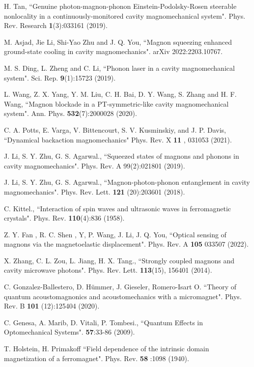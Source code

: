 \documentclass[aps,pra,superscriptaddress,balancelastpage,twocolumn]{revtex4}
\begin{document}
\begin{thebibliography}{99}
 H. Tan, ``Genuine photon-magnon-phonon
Einstein-Podolsky-Rosen steerable nonlocality in a continuously-monitored
cavity magnomechanical system". Phys. Rev. Research \textbf{1}(3):033161
(2019).

 M. Asjad, Jie Li, Shi-Yao Zhu and J. Q. You, ``Magnon
squeezing enhanced ground-state cooling in cavity magnomechanics". arXiv
2022:2203.10767.

 M. S. Ding, L. Zheng and C. Li, ``Phonon laser in a cavity
magnomechanical system". Sci. Rep. \textbf{9}(1):15723 (2019).

 L. Wang, Z. X. Yang, Y. M. Liu, C. H. Bai, D. Y. Wang, S.
Zhang and H. F. Wang, ``Magnon blockade in a PT-symmetric-like cavity
magnomechanical system". Ann. Phys. \textbf{532}(7):2000028 (2020).

 C. A. Potts, E. Varga, V. Bittencourt, S. V. Kusminskiy, and
J. P. Davis, ``Dynamical backaction magnomechanics" Phys. Rev. X \textbf{11}%
, 031053 (2021).

 J. Li, S. Y. Zhu, G. S. Agarwal., ``Squeezed states of
magnons and phonons in cavity magnomechanics". Phys. Rev. A 99(2):021801
(2019).

 J. Li, S. Y. Zhu, G. S. Agarwal., ``Magnon-photon-phonon
entanglement in cavity magnomechanics". Phys. Rev. Lett. \textbf{121}%
(20):203601 (2018).

 C. Kittel., ``Interaction of spin waves and ultrasonic
waves in ferromagnetic crystals". Phys. Rev. \textbf{110}(4):836 (1958).

 Z. Y. Fan , R. C. Shen , Y, P. Wang, J. Li, J. Q. You,
``Optical sensing of magnons via the magnetoelastic displacement". Phys.
Rev. A \textbf{105} 033507 (2022).

 X. Zhang, C. L. Zou, L. Jiang, H. X. Tang., ``Strongly coupled
magnons and cavity microwave photons". Phys. Rev. Lett. \textbf{113}(15),
156401 (2014).

 C. Gonzalez-Ballestero, D. H\"{u}mmer, J. Gieseler,
Romero-Isart O. ``Theory of quantum acoustomagnonics and acoustomechanics
with a micromagnet". Phys. Rev. B \textbf{101} (12):125404 (2020).

 C. Genesa, A. Marib, D. Vitali, P. Tombesi., ``Quantum
Effects in Optomechanical Systems". \textbf{57}:33-86 (2009).

 T. Holstein, H. Primakoff ``Field dependence of the
intrinsic domain magnetization of a ferromagnet". Phys. Rev. \textbf{58}%
:1098 (1940).


\end{thebibliography}
\end{document}

